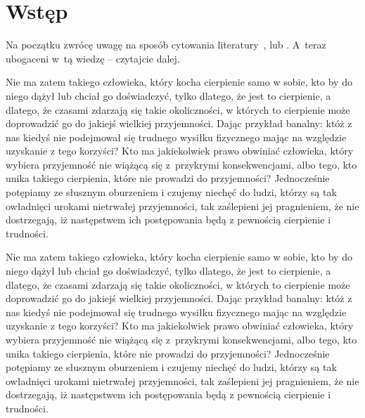 \documentclass[12pt]{mwbk}
\theoremstyle{plain}
\theoremstyle{definition}
\theoremstyle{remark}
\begin{document}



\tableofcontents


\chapter*{Wstęp}



Na początku zwrócę uwagę na sposób cytowania
literatury~\cite{Beth1984}, lub \cite{Gollmann1989,Meier1994}. A~teraz
ubogaceni w~tą wiedzę -- czytajcie dalej.



Nie ma zatem takiego człowieka, który kocha cierpienie samo w sobie, 
kto by do niego dążył lub chciał go doświadczyć, tylko dlatego, że
jest to cierpienie, a dlatego, że czasami zdarzają się takie 
okoliczności, w których to cierpienie może doprowadzić 
go do jakiejś wielkiej przyjemności. 
Dając przykład banalny: któż z nas kiedyś nie podejmował 
się trudnego wysiłku fizycznego mając na względzie 
uzyskanie z tego korzyści? 
Kto ma jakiekolwiek prawo obwiniać człowieka, 
który wybiera przyjemność nie wiążącą się z~przykrymi 
konsekwencjami, albo tego, kto unika takiego cierpienia, 
które nie prowadzi do przyjemności? 
Jednocześnie potępiamy ze słusznym oburzeniem i czujemy 
niechęć do ludzi, którzy są tak owładnięci urokami nietrwałej 
przyjemności, tak zaślepieni jej pragnieniem, 
że nie dostrzegają, iż następstwem ich 
postępowania będą z pewnością cierpienie i trudności.












Nie ma zatem takiego człowieka, który kocha cierpienie samo w sobie, 
kto by do niego dążył lub chciał go doświadczyć, tylko dlatego, że
jest to cierpienie, a dlatego, że czasami zdarzają się takie 
okoliczności, w których to cierpienie może doprowadzić 
go do jakiejś wielkiej przyjemności. 
Dając przykład banalny: któż z nas kiedyś nie podejmował 
się trudnego wysiłku fizycznego mając na względzie 
uzyskanie z tego korzyści? 
Kto ma jakiekolwiek prawo obwiniać człowieka, 
który wybiera przyjemność nie wiążącą się z~przykrymi 
konsekwencjami, albo tego, kto unika takiego cierpienia, 
które nie prowadzi do przyjemności? 
Jednocześnie potępiamy ze słusznym oburzeniem i czujemy 
niechęć do ludzi, którzy są tak owładnięci urokami nietrwałej 
przyjemności, tak zaślepieni jej pragnieniem, 
że nie dostrzegają, iż następstwem ich 
postępowania będą z pewnością cierpienie i trudności.
\end{document}
